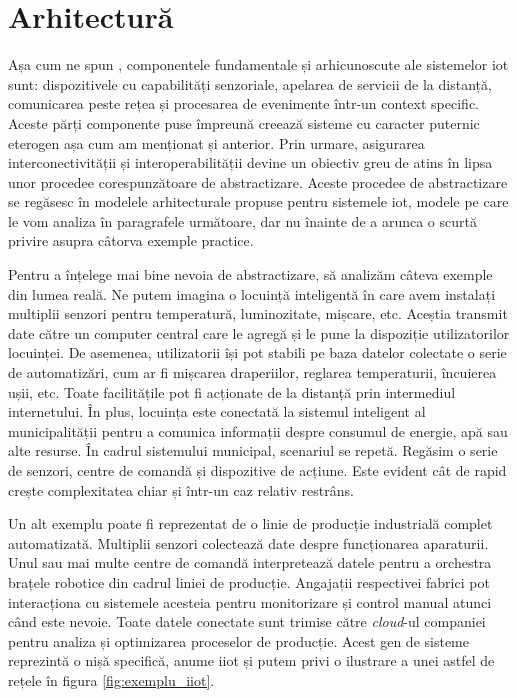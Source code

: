 
\section{Arhitectură}

Așa cum ne spun \citet{Khodadadi2016}, componentele fundamentale și arhicunoscute ale sistemelor \acrshort{iot} sunt: dispozitivele cu capabilități senzoriale, apelarea de servicii de la distanță, comunicarea peste rețea și procesarea de evenimente într-un context specific. Aceste părți componente puse împreună creează sisteme cu caracter puternic eterogen așa cum am menționat și anterior. Prin urmare, asigurarea interconectivității și interoperabilității devine un obiectiv greu de atins în lipsa unor procedee corespunzătoare de abstractizare. Aceste procedee de abstractizare se regăsesc în modelele arhitecturale propuse pentru sistemele \acrshort{iot}, modele pe care le vom analiza în paragrafele următoare, dar nu înainte de a arunca o scurtă privire asupra câtorva exemple practice.

Pentru a înțelege mai bine nevoia de abstractizare, să analizăm câteva exemple din lumea reală. Ne putem imagina o locuință inteligentă în care avem instalați multiplii senzori pentru temperatură, luminozitate, mișcare, etc. Aceștia transmit date către un computer central care le agregă și le pune la dispoziție utilizatorilor locuinței. De asemenea, utilizatorii își pot stabili pe baza datelor colectate o serie de automatizări, cum ar fi mișcarea draperiilor, reglarea temperaturii, încuierea ușii, etc. Toate facilitățile pot fi acționate de la distanță prin intermediul internetului. În plus, locuința este conectată la sistemul inteligent al municipalității pentru a comunica informații despre consumul de energie, apă sau alte resurse. În cadrul sistemului municipal, scenariul se repetă. Regăsim o serie de senzori, centre de comandă și dispozitive de acțiune. Este evident cât de rapid crește complexitatea chiar și într-un caz relativ restrâns.

Un alt exemplu poate fi reprezentat de o linie de producție industrială complet automatizată. Multiplii senzori colectează date despre funcționarea aparaturii. Unul sau mai multe centre de comandă interpretează datele pentru a orchestra brațele robotice din cadrul liniei de producție. Angajații respectivei fabrici pot interacționa cu sistemele acesteia pentru monitorizare și control manual atunci când este nevoie. Toate datele conectate sunt trimise către \textit{cloud}-ul companiei pentru analiza și optimizarea proceselor de producție. Acest gen de sisteme reprezintă o nișă specifică, anume \acrfull{iiot} și putem privi o ilustrare a unei astfel de rețele în figura \ref{fig:exemplu_iiot}.

